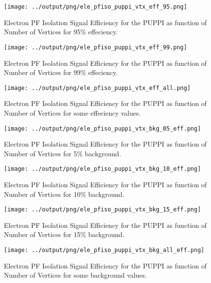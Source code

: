 \documentclass[11pt]{book}
\begin{document}
\begin{figure}[htb]
\centering
\texttt{[image: ../output/png/ele\_pfiso\_puppi\_vtx\_eff\_95.png]}
\caption{Electron PF Isolation Signal Efficiency for the PUPPI as function of Number of Vertices for 95\% effeciency.}
\label{fig:ele_pfiso_vtx_eff_puppi_eff_95}
\end{figure}

\begin{figure}[htb]
\centering
\texttt{[image: ../output/png/ele\_pfiso\_puppi\_vtx\_eff\_99.png]}
\caption{Electron PF Isolation Signal Efficiency for the PUPPI as function of Number of Vertices for 99\% effeciency.}
\label{fig:ele_pfiso_vtx_eff_puppi_eff_99}
\end{figure}

\begin{figure}[htb]
\centering
\texttt{[image: ../output/png/ele\_pfiso\_puppi\_vtx\_eff\_all.png]}
\caption{Electron PF Isolation Signal Efficiency for the PUPPI as function of Number of Vertices for some effeciency values.}
\label{fig:ele_pfiso_vtx_eff_puppi_eff_all}
\end{figure}

\begin{figure}[htb]
\centering
\texttt{[image: ../output/png/ele\_pfiso\_puppi\_vtx\_bkg\_05\_eff.png]}
\caption{Electron PF Isolation Signal Efficiency for the PUPPI as function of Number of Vertices for 5\% background.}
\label{fig:ele_pfiso_vtx_eff_puppi_bkg_05_eff}
\end{figure}

\begin{figure}[htb]
\centering
\texttt{[image: ../output/png/ele\_pfiso\_puppi\_vtx\_bkg\_10\_eff.png]}
\caption{Electron PF Isolation Signal Efficiency for the PUPPI as function of Number of Vertices for 10\% background.}
\label{fig:ele_pfiso_vtx_eff_puppi_bkg_10_eff}
\end{figure}

\begin{figure}[htb]
\centering
\texttt{[image: ../output/png/ele\_pfiso\_puppi\_vtx\_bkg\_15\_eff.png]}
\caption{Electron PF Isolation Signal Efficiency for the PUPPI as function of Number of Vertices for 15\% background.}
\label{fig:ele_pfiso_vtx_eff_puppi_bkg_15_eff}
\end{figure}

\begin{figure}[htb]
\centering
\texttt{[image: ../output/png/ele\_pfiso\_puppi\_vtx\_bkg\_all\_eff.png]}
\caption{Electron PF Isolation Signal Efficiency for the PUPPI as function of Number of Vertices for some background values.}
\label{fig:ele_pfiso_vtx_eff_puppi_bkg_all_eff}
\end{figure}
\clearpage
\end{document}
